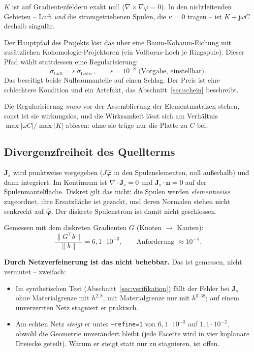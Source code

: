 \documentclass[11pt,a4paper]{article}
\newcommand{\Js}{\mathbf{J}_s}
\begin{document}
$K$ ist auf Gradientenfeldern exakt null ($\nabla\times\nabla\varphi = 0$).
In den nichtleitenden Gebieten -- Luft \emph{und} die stromgetriebenen Spulen,
die $\kappa = 0$ tragen -- ist $K + \mathrm{j}\omega C$ deshalb singulär.

Der Hauptpfad des Projekts löst das über eine Baum-Kobaum-Eichung mit
zusätzlichen Kohomologie-Projektoren (ein Volltorus-Loch je Ringspule). Dieser
Pfad wählt stattdessen eine Regularisierung:
\begin{equation}
  \sigma_{\text{Luft}} = \varepsilon\,\sigma_{\text{Leiter}},
  \qquad \varepsilon = 10^{-8} \text{ (Vorgabe, einstellbar)}.
\end{equation}
Das beseitigt beide Nullraumanteile auf einen Schlag. Der Preis ist eine
schlechtere Kondition und ein Artefakt, das Abschnitt~\ref{sec:schein}
beschreibt.

Die Regularisierung \emph{muss} vor der Assemblierung der Elementmatrizen
stehen, sonst ist sie wirkungslos, und die Wirksamkeit lässt sich am
Verhältnis $\max|\omega C| / \max|K|$ ablesen: ohne sie trüge nur die Platte
zu $C$ bei.

\subsection{Divergenzfreiheit des Quellterms}
\label{sec:quellterm}

$\Js$ wird punktweise vorgegeben ($J\hat{\boldsymbol{\varphi}}$ in den
Spulenelementen, null außerhalb) und dann integriert. Im Kontinuum ist
$\nabla\cdot\Js = 0$ und $\Js\cdot\mathbf{n} = 0$ auf der Spulenmantelfläche.
Diskret gilt das nicht: die Spulen werden \emph{elementweise} zugeordnet, ihre
Ersatzfläche ist gezackt, und deren Normalen stehen nicht senkrecht auf
$\hat{\boldsymbol{\varphi}}$. Der diskrete Spulenstrom ist damit nicht
geschlossen.

Gemessen mit dem diskreten Gradienten $G$ (Knoten $\to$ Kanten):
\begin{equation}
  \frac{\|G^{\!\top} b\|}{\|b\|} = 6{,}1\cdot 10^{-3},
  \qquad \text{Anforderung } \approx 10^{-4}.
\end{equation}

\textbf{Durch Netzverfeinerung ist das nicht behebbar.} Das ist gemessen, nicht
vermutet -- zweifach:

\begin{itemize}[nosep]
\item Im synthetischen Test (Abschnitt~\ref{sec:verifikation}) fällt der
  Fehler bei $\Js$ ohne Materialgrenze mit $h^{2{,}8}$, mit Materialgrenze nur
  mit $h^{0{,}38}$; auf einem unverzerrten Netz stagniert er praktisch.
\item Am echten Netz \emph{steigt} er unter \texttt{--refine=1} von
  $6{,}1\cdot10^{-3}$ auf $1{,}1\cdot10^{-2}$, obwohl die Geometrie
  unverändert bleibt (jede Facette wird in vier koplanare Dreiecke geteilt).
  Warum er steigt statt nur zu stagnieren, ist offen.
\end{itemize}
\end{document}
